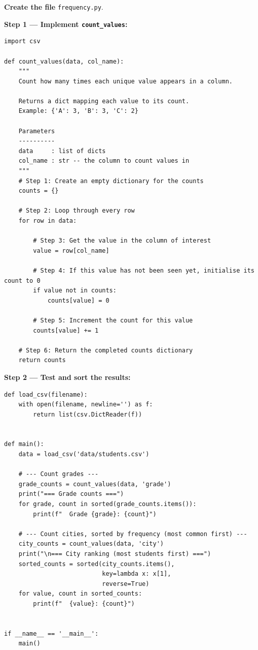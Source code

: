 \documentclass{cslab}
\begin{document}
\textbf{Create the file} \texttt{frequency.py}.

\textbf{Step 1 --- Implement \texttt{count\_values}:}

\begin{lstlisting}
import csv

def count_values(data, col_name):
    """
    Count how many times each unique value appears in a column.

    Returns a dict mapping each value to its count.
    Example: {'A': 3, 'B': 3, 'C': 2}

    Parameters
    ----------
    data     : list of dicts
    col_name : str -- the column to count values in
    """
    # Step 1: Create an empty dictionary for the counts
    counts = {}

    # Step 2: Loop through every row
    for row in data:

        # Step 3: Get the value in the column of interest
        value = row[col_name]

        # Step 4: If this value has not been seen yet, initialise its count to 0
        if value not in counts:
            counts[value] = 0

        # Step 5: Increment the count for this value
        counts[value] += 1

    # Step 6: Return the completed counts dictionary
    return counts
\end{lstlisting}

\textbf{Step 2 --- Test and sort the results:}

\begin{lstlisting}
def load_csv(filename):
    with open(filename, newline='') as f:
        return list(csv.DictReader(f))


def main():
    data = load_csv('data/students.csv')

    # --- Count grades ---
    grade_counts = count_values(data, 'grade')
    print("=== Grade counts ===")
    for grade, count in sorted(grade_counts.items()):
        print(f"  Grade {grade}: {count}")

    # --- Count cities, sorted by frequency (most common first) ---
    city_counts = count_values(data, 'city')
    print("\n=== City ranking (most students first) ===")
    sorted_counts = sorted(city_counts.items(),
                           key=lambda x: x[1],
                           reverse=True)
    for value, count in sorted_counts:
        print(f"  {value}: {count}")


if __name__ == '__main__':
    main()
\end{lstlisting}
\end{document}
